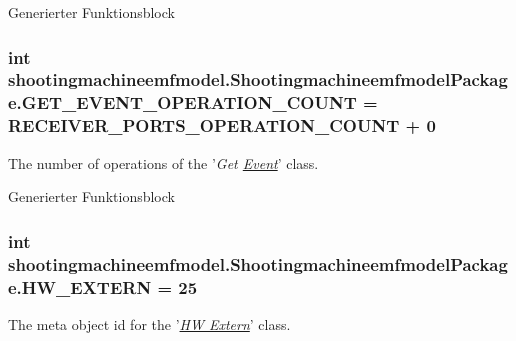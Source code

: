 Generierter Funktionsblock  \hypertarget{interfaceshootingmachineemfmodel_1_1_shootingmachineemfmodel_package_a9000680fce702b54d9bf48bd64789be7}{
\subsubsection[{G\-E\-T\-\_\-\-E\-V\-E\-N\-T\-\_\-\-O\-P\-E\-R\-A\-T\-I\-O\-N\-\_\-\-C\-O\-U\-N\-T}]{\setlength{\rightskip}{0pt plus 5cm}int shootingmachineemfmodel.\-Shootingmachineemfmodel\-Package.\-G\-E\-T\-\_\-\-E\-V\-E\-N\-T\-\_\-\-O\-P\-E\-R\-A\-T\-I\-O\-N\-\_\-\-C\-O\-U\-N\-T = {\bf R\-E\-C\-E\-I\-V\-E\-R\-\_\-\-P\-O\-R\-T\-S\-\_\-\-O\-P\-E\-R\-A\-T\-I\-O\-N\-\_\-\-C\-O\-U\-N\-T} + 0}}\label{interfaceshootingmachineemfmodel_1_1_shootingmachineemfmodel_package_a9000680fce702b54d9bf48bd64789be7}
The number of operations of the '{\itshape Get \hyperlink{interfaceshootingmachineemfmodel_1_1_event}{Event}}' class.

Generierter Funktionsblock  \hypertarget{interfaceshootingmachineemfmodel_1_1_shootingmachineemfmodel_package_a58063da7516b27741575dfd0ca3badff}{
\subsubsection[{H\-W\-\_\-\-E\-X\-T\-E\-R\-N}]{\setlength{\rightskip}{0pt plus 5cm}int shootingmachineemfmodel.\-Shootingmachineemfmodel\-Package.\-H\-W\-\_\-\-E\-X\-T\-E\-R\-N = 25}}\label{interfaceshootingmachineemfmodel_1_1_shootingmachineemfmodel_package_a58063da7516b27741575dfd0ca3badff}
The meta object id for the '\hyperlink{classshootingmachineemfmodel_1_1impl_1_1_h_w_extern_impl}{{\itshape H\-W Extern}}' class.

